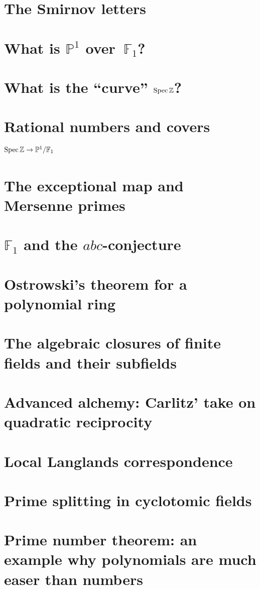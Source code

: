 \documentclass[a4paper]{memoir}
\begin{document}
\setcounter{section}{0}

\section{The Smirnov letters}


\section{What is $\mathbb{P}^1$ over~$\mathbb{F}_1$?}

\section{What is the ``curve'' $\operatorname{Spec}\mathbb{Z}$?}

\section{Rational numbers and covers $\operatorname{Spec}\mathbb{Z}\to\mathbb{P}^1/\mathbb{F}_1$}

\section{The exceptional map and Mersenne primes}

\section{$\mathbb{F}_1$ and the $abc$-conjecture}

\section{Ostrowski's theorem for a polynomial ring}

\section{The algebraic closures of finite fields and their subfields}


\section{Advanced alchemy: Carlitz' take on quadratic reciprocity}

\section{Local Langlands correspondence}

\section{Prime splitting in cyclotomic fields}

\section{Prime number theorem: an example why polynomials are much easer than numbers}



\end{document}

